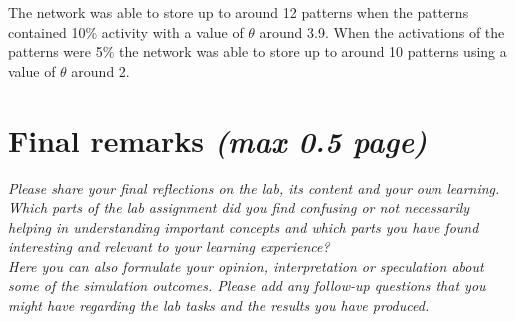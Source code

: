 \documentclass[a4paper]{article}
\begin{document}
The network was able to store up to around 12 patterns when the patterns contained 10\% activity with a value of $\theta$ around 3.9. When the activations of the patterns were 5\% the network was able to store up to around 10 patterns using a value of $\theta$ around 2. 


\section{Final remarks \normalsize{\textit{(max 0.5 page)}}}
\textit{Please share your final reflections on the lab, its content and your own learning. Which parts of the lab assignment did you find confusing or not necessarily helping in understanding important concepts and which parts you have found interesting and relevant to your learning experience? \\
Here you can also formulate your opinion, interpretation or speculation about some of the simulation outcomes. Please add any follow-up questions that you might have regarding the lab tasks and the results you have produced.}
\end{document}
